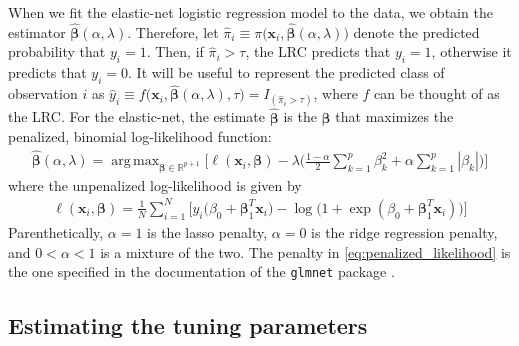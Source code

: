 \documentclass{article}
\DeclareMathOperator*{\argmax}{arg\,max}
\begin{document}
When we fit the elastic-net logistic regression model to the data, we obtain the estimator 
$\hat{\boldsymbol\beta}(\alpha,\lambda)$.  Therefore, 
let $\hat\pi_i \equiv \pi \bigl( \mathbf{x}_i,\hat{\boldsymbol\beta}(\alpha,\lambda) \bigr)$ denote the predicted probability 
that $y_i = 1$.  Then, if $\hat\pi_i > \tau$, the LRC predicts that $y_i = 1$, otherwise it predicts that $y_i = 0$.  
It will be useful to represent the predicted class of observation
$i$ as $\hat{y}_i \equiv f \bigl( \mathbf{x}_i,\hat{\boldsymbol{\beta}}(\alpha,\lambda),\tau \bigr) = 
I_{(\hat\pi_i > \tau)}$, where $f$ can be thought of as the LRC.
For the elastic-net, the estimate $\hat{\boldsymbol{\beta}}$ is the $\boldsymbol{\beta}$
that maximizes the penalized, binomial log-likelihood function:
\begin{align}
\label{eq:penalized_likelihood}
\hat{\boldsymbol{\beta}}(\alpha,\lambda) = \argmax_{\boldsymbol\beta \in \mathbb{R}^{p+1}} \Biggl[ \ell(\mathbf{x}_i,\boldsymbol{\beta}) - \lambda 
\biggl( \frac{1-\alpha}{2} \sum_{k=1}^p \beta_k^2 + \alpha \sum_{k=1}^p |\beta_k| \biggr) \Biggr]
\end{align}
\noindent where the unpenalized log-likelihood is given by
\begin{align}
\label{eq:unpenalized_likelihood}
\ell(\mathbf{x}_i,\boldsymbol{\beta}) = \frac{1}{N} \sum_{i=1}^N \biggl[ y_i \bigl( \beta_0 + \boldsymbol\beta_1^T\mathbf{x}_i \bigr) 
  - \log \bigl( 1 + \exp(\beta_0 + \boldsymbol\beta_1^T\mathbf{x}_i ) \bigl) \biggr]
\end{align}
\noindent Parenthetically, $\alpha = 1$ is the lasso penalty, $\alpha = 0$ is the ridge regression penalty,
and $0 < \alpha < 1$ is a mixture of the two. The penalty in \eqref{eq:penalized_likelihood} is the one 
specified in the documentation of the {\tt glmnet} package \cite{glmnet}.


\subsection{Estimating the tuning parameters}
\end{document}

